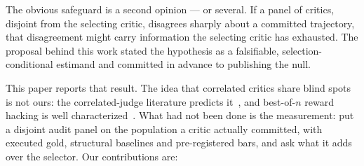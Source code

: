 \documentclass[11pt]{article}
\begin{document}
The obvious safeguard is a second opinion --- or several. If a panel of critics, disjoint from the selecting critic, disagrees sharply about a committed trajectory, that disagreement might carry information the selecting critic has exhausted. The proposal behind this work stated the hypothesis as a falsifiable, selection-conditional estimand and committed in advance to publishing the null.

This paper reports that result. The idea that correlated critics share blind spots is not ours: the correlated-judge literature predicts it~\citep{goel2025great,kim2025correlated,kohli2026nine,hossain2026agreement,afrin2026ensembles}, and best-of-$n$ reward hacking is well characterized~\citep{gao2023scaling,khalaf2025inference,yu2026caution}. What had not been done is the measurement: put a disjoint audit panel on the population a critic actually committed, with executed gold, structural baselines and pre-registered bars, and ask what it adds over the selector. Our contributions are:
\end{document}
